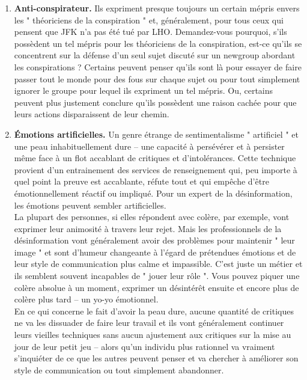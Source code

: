 \documentclass[11pt,twoside,a4paper]{article}
\begin{document}
\begin{enumerate}
	\item \textbf{Anti-conspirateur. } Ils expriment presque toujours un certain m{\'e}pris envers les " th{\'e}oriciens de la conspiration " et, g{\'e}n{\'e}ralement, pour tous ceux qui pensent que JFK n'a pas {\'e}t{\'e} tu{\'e} par LHO. Demandez-vous pourquoi, s'ils poss{\`e}dent un tel m{\'e}pris pour les th{\'e}oriciens de la conspiration, est-ce qu'ils se concentrent sur la d{\'e}fense d'un seul sujet discut{\'e} sur un newgroup abordant les conspirations ? Certains peuvent penser qu'ils sont l{\`a} pour essayer de faire passer tout le monde pour des fous sur chaque sujet ou pour tout simplement ignorer le groupe pour lequel ils expriment un tel m{\'e}pris. Ou, certains peuvent plus justement conclure qu'ils poss{\`e}dent une raison cach{\'e}e pour que leurs actions disparaissent de leur chemin.
	\item \textbf{{\'E}motions artificielles. } Un genre {\'e}trange de sentimentalisme " artificiel " et une peau inhabituellement dure -- une capacit{\'e} {\`a} pers{\'e}v{\'e}rer et {\`a} persister m{\^e}me face {\`a} un flot accablant de critiques et d'intol{\'e}rances. Cette technique provient d'un entrainement des services de renseignement qui, peu importe {\`a} quel point la preuve est accablante, r{\'e}fute tout et qui emp{\^e}che d'{\^e}tre {\'e}motionnellement r{\'e}actif ou impliqu{\'e}. Pour un expert de la d{\'e}sinformation, les {\'e}motions peuvent sembler artificielles.~\\
La plupart des personnes, si elles r{\'e}pondent avec col{\`e}re, par exemple, vont exprimer leur animosit{\'e} {\`a} travers leur rejet. Mais les professionnels de la d{\'e}sinformation vont g{\'e}n{\'e}ralement avoir des probl{\`e}mes pour maintenir " leur image " et sont d'humeur changeante {\`a} l'{\'e}gard de pr{\'e}tendues {\'e}motions et de leur style de communication plus calme et impassible. C'est juste un m{\'e}tier et ils semblent souvent incapables de " jouer leur r{\^o}le ". Vous pouvez piquer une col{\`e}re absolue {\`a} un moment, exprimer un d{\'e}sint{\'e}r{\^e}t ensuite et encore plus de col{\`e}re plus tard -- un yo-yo {\'e}motionnel. ~\\
En ce qui concerne le fait d'avoir la peau dure, aucune quantit{\'e} de critiques ne va les dissuader de faire leur travail et ils vont g{\'e}n{\'e}ralement continuer leurs vieilles techniques sans aucun ajustement aux critiques sur la mise au jour de leur petit jeu -- alors qu'un individu plus rationnel va vraiment s'inqui{\'e}ter de ce que les autres peuvent penser et va chercher {\`a} am{\'e}liorer son style de communication ou tout simplement abandonner.

\end{enumerate}
\end{document}
